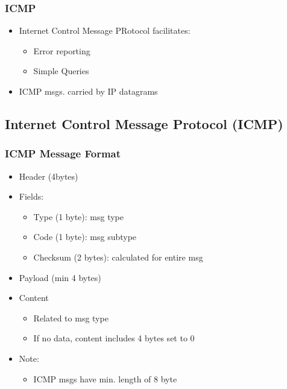 \subsubsection{ICMP}
\begin{itemize}
	\item Internet Control Message PRotocol facilitates:
	\begin{itemize}
		\item Error reporting
		\item Simple Queries
	\end{itemize}
	\item ICMP msgs. carried by IP datagrams
\end{itemize}
\subsection{Internet Control Message Protocol (ICMP)}
\subsubsection{ICMP Message Format}
\begin{itemize}
	\item Header (4bytes)
	\item Fields:
	\begin{itemize}
		\item Type (1 byte): msg type
		\item Code (1 byte): msg subtype
		\item Checksum (2 bytes): calculated for entire msg
	\end{itemize}
	\item Payload (min 4 bytes)
	\item Content
	\begin{itemize}
		\item Related to msg type
		\item If no data, content includes 4 bytes set to 0
	\end{itemize}
	\item Note:
	\begin{itemize}
		\item ICMP msgs have min. length of 8 byte
	\end{itemize}
\end{itemize}
